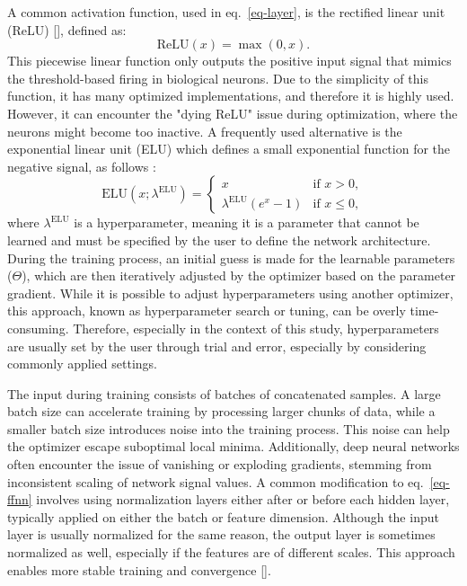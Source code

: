 A common activation function, used in eq.~\ref{eq-layer}, is the rectified linear unit (ReLU) [\cite{fukushima1980,nair2010}], defined as:
%
\begin{equation}
\text{ReLU}(x) = \max(0, x).
\end{equation}
%
This piecewise linear function only outputs the positive input signal that mimics the threshold-based firing in biological neurons. Due to the simplicity of this function, it has many optimized implementations, and therefore it is highly used.  However, it can encounter the "dying ReLU" issue during optimization, where the neurons might become too inactive. A frequently used alternative is the exponential linear unit (ELU) which defines a small exponential function for the negative signal, as follows :
%
\begin{equation}
 \text{ELU}(x;\lambda^{\text{ELU}}) = 
\begin{cases} 
x & \text{if } x > 0, \\
\lambda^{\text{ELU}} (e^x - 1) & \text{if } x \leq 0,
\end{cases}
\end{equation}
%
where $\lambda^{\text{ELU}}$ is a hyperparameter, meaning it is a parameter that cannot be learned and must be specified by the user to define the network architecture. During the training process, an initial guess is made for the learnable parameters ($\Theta$), which are then iteratively adjusted by the optimizer based on the parameter gradient. While it is possible to adjust hyperparameters using another optimizer, this approach, known as hyperparameter search or tuning, can be overly time-consuming. Therefore, especially in the context of this study, hyperparameters are usually set by the user through trial and error, especially by considering commonly applied settings.

The input during training consists of batches of concatenated samples. A large batch size can accelerate training by processing larger chunks of data, while a smaller batch size introduces noise into the training process. This noise can help the optimizer escape suboptimal local minima. Additionally, deep neural networks often encounter the issue of vanishing or exploding gradients, stemming from inconsistent scaling of network signal values. A common modification to eq.~\ref{eq-ffnn} involves using normalization layers either after or before each hidden layer, typically applied on either the batch or feature dimension. Although the input layer is usually normalized for the same reason, the output layer is sometimes normalized as well, especially if the features are of different scales. This approach enables more stable training and convergence [\cite{ioffe2015, bjorck2018, jingjing2019, gao2020, singh2022}].

